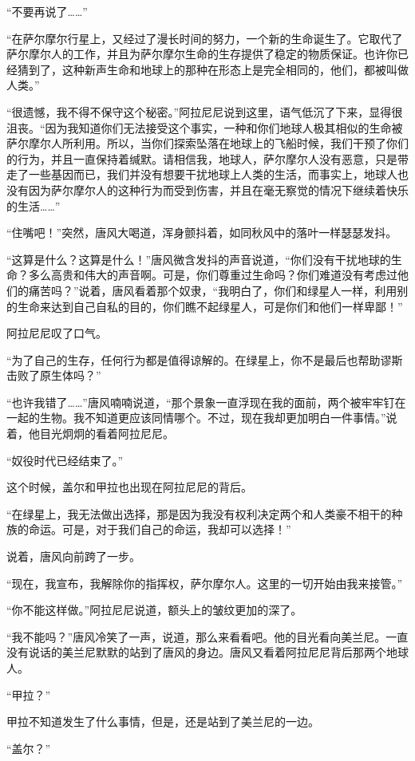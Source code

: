 “不要再说了……” 

“在萨尔摩尔行星上，又经过了漫长时间的努力，一个新的生命诞生了。它取代了萨尔摩尔人的工作，并且为萨尔摩尔生命的生存提供了稳定的物质保证。也许你已经猜到了，这种新声生命和地球上的那种在形态上是完全相同的，他们，都被叫做人类。” 

“很遗憾，我不得不保守这个秘密。”阿拉尼尼说到这里，语气低沉了下来，显得很沮丧。“因为我知道你们无法接受这个事实，一种和你们地球人极其相似的生命被萨尔摩尔人所利用。所以，当你们探索坠落在地球上的飞船时候，我们干预了你们的行为，并且一直保持着缄默。请相信我，地球人，萨尔摩尔人没有恶意，只是带走了一些基因而已，我们并没有想要干扰地球上人类的生活，而事实上，地球人也没有因为萨尔摩尔人的这种行为而受到伤害，并且在毫无察觉的情况下继续着快乐的生活……” 

“住嘴吧！”突然，唐风大喝道，浑身颤抖着，如同秋风中的落叶一样瑟瑟发抖。 

“这算是什么？这算是什么！”唐风微含发抖的声音说道，“你们没有干扰地球的生命？多么高贵和伟大的声音啊。可是，你们尊重过生命吗？你们难道没有考虑过他们的痛苦吗？”说着，唐风看着那个奴隶，“我明白了，你们和绿星人一样，利用别的生命来达到自己自私的目的，你们瞧不起绿星人，可是你们和他们一样卑鄙！” 

阿拉尼尼叹了口气。 

“为了自己的生存，任何行为都是值得谅解的。在绿星上，你不是最后也帮助谬斯击败了原生体吗？” 

“也许我错了……”唐风喃喃说道，“那个景象一直浮现在我的面前，两个被牢牢钉在一起的生物。我不知道更应该同情哪个。不过，现在我却更加明白一件事情。”说着，他目光炯炯的看着阿拉尼尼。 

“奴役时代已经结束了。” 

这个时候，盖尔和甲拉也出现在阿拉尼尼的背后。 

“在绿星上，我无法做出选择，那是因为我没有权利决定两个和人类豪不相干的种族的命运。可是，对于我们自己的命运，我却可以选择！” 

说着，唐风向前跨了一步。 

“现在，我宣布，我解除你的指挥权，萨尔摩尔人。这里的一切开始由我来接管。” 

“你不能这样做。”阿拉尼尼说道，额头上的皱纹更加的深了。 

“我不能吗？”唐风冷笑了一声，说道，那么来看看吧。他的目光看向美兰尼。一直没有说话的美兰尼默默的站到了唐风的身边。唐风又看着阿拉尼尼背后那两个地球人。 

“甲拉？” 

甲拉不知道发生了什么事情，但是，还是站到了美兰尼的一边。 

“盖尔？” 

